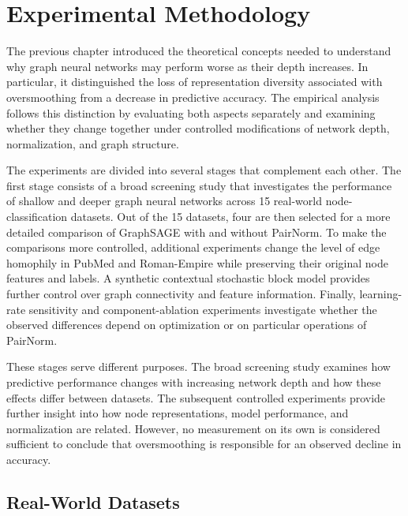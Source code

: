 \documentclass[english]{lni}
\begin{document}


\section{Experimental Methodology}
\label{sec:experimental-methodology}

The previous chapter introduced the theoretical concepts needed to understand why graph neural networks may perform worse as their depth increases. In particular, it distinguished the loss of representation diversity associated with oversmoothing from a decrease in predictive accuracy. The empirical analysis follows this distinction by evaluating both aspects separately and examining whether they change together under controlled modifications of network depth, normalization, and graph structure.

The experiments are divided into several stages that complement each other. The first stage consists of a broad screening study that investigates the performance of shallow and deeper graph neural networks across 15 real-world node-classification datasets. Out of the 15 datasets, four are then selected for a more detailed comparison of GraphSAGE with and without PairNorm. To make the comparisons more controlled, additional experiments change the level of edge homophily in PubMed and Roman-Empire while preserving their original node features and labels. A synthetic contextual stochastic block model provides further control over graph connectivity and feature information. Finally, learning-rate sensitivity and component-ablation experiments investigate whether the observed differences depend on optimization or on particular operations of PairNorm.

These stages serve different purposes. The broad screening study examines how predictive performance changes with increasing network depth and how these effects differ between datasets. The subsequent controlled experiments provide further insight into how node representations, model performance, and normalization are related. However, no measurement on its own is considered sufficient to conclude that oversmoothing is responsible for an observed decline in accuracy.

\subsection{Real-World Datasets}
\label{sec:realworld-datasets}
\end{document}
